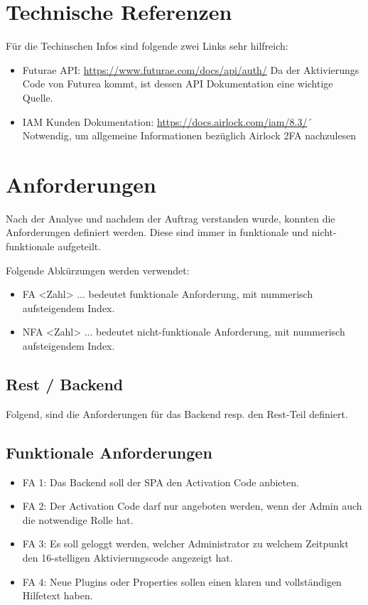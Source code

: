 \section{Technische Referenzen}
Für die Techinschen Infos sind folgende zwei Links sehr hilfreich:
\begin{itemize}
	\item Futurae API: \url{https://www.futurae.com/docs/api/auth/}\newline
	 Da der Aktivierungs Code von Futurea kommt, ist dessen API Dokumentation eine wichtige Quelle.
	\item IAM Kunden Dokumentation: \url{https://docs.airlock.com/iam/8.3/}´
	Notwendig, um allgemeine Informationen bezüglich Airlock 2FA nachzulesen
\end{itemize}

\section{Anforderungen}
Nach der Analyse und nachdem der Auftrag verstanden wurde, konnten die Anforderungen definiert werden. Diese sind immer in funktionale und nicht-funktionale aufgeteilt.

Folgende Abkürzungen werden verwendet:
\begin{itemize}
	\item FA <Zahl> ... bedeutet funktionale Anforderung, mit nummerisch aufsteigendem Index.
	\item NFA <Zahl> ... bedeutet nicht-funktionale Anforderung, mit nummerisch aufsteigendem Index.
\end{itemize}

\subsection{Rest / Backend} \label{subsec:anforderungenBackend}

Folgend, sind die Anforderungen für das Backend resp. den Rest-Teil definiert.

\subsection*{Funktionale Anforderungen}
\begin{itemize}
	\item FA 1: Das Backend soll der SPA den Activation Code anbieten.
	\item FA 2: Der Activation Code darf nur angeboten werden, wenn der Admin auch die notwendige Rolle hat.
	\item FA 3: Es soll geloggt werden, welcher Administrator zu welchem Zeitpunkt den 16-stelligen Aktivierungscode angezeigt hat.
	\item FA 4: Neue Plugins oder Properties sollen einen klaren und vollständigen Hilfetext haben.
\end{itemize}

